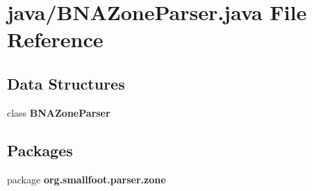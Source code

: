 \section{java/\+B\+N\+A\+Zone\+Parser.java File Reference}
\label{BNAZoneParser_8java}
\subsection*{Data Structures}
\begin{DoxyCompactItemize}
\item 
class {\bf B\+N\+A\+Zone\+Parser}
\end{DoxyCompactItemize}
\subsection*{Packages}
\begin{DoxyCompactItemize}
\item 
package {\bf org.\+smallfoot.\+parser.\+zone}
\end{DoxyCompactItemize}
